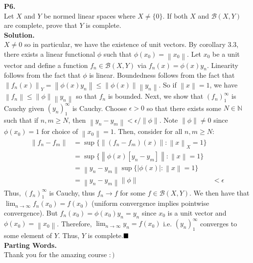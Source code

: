 \documentclass{article}
\newcommand{\norm}[1]{\left\lVert#1\right\rVert}
\begin{document}
    \newpage
    \textbf{P6.}\\

    Let $X$ and $Y$ be normed linear spaces where $X\neq\{0\}$. If both $X$ and $\mathscr{B}(X,Y)$ are complete, prove that $Y$ is complete.\\

    \textbf{Solution.}\\

    $X\neq 0$ so in particular, we have the existence of unit vectors. By corollary 3.3, there exists a linear functional $\phi$ such that $\phi(x_0) = \norm{x_0}$.
    Let $x_0$ be a unit vector and define a function $f_n\in\mathscr{B}(X,Y)$ via $f_{n}(x) = \phi(x)y_n$. Linearity follows from the fact that $\phi$ is linear.
    Boundedness follows from the fact that $\norm{f_n(x)}_Y = \norm{\phi(x)y_n} \leq \norm{\phi(x)}\norm{y_n}$. So if $\norm{x}=1$, we have 
    $\norm{f_n}\leq \norm{\phi}\norm{y_n}$ so that $f_n$ is bounded. Next, we show that $(f_n)_1^{\infty}$ is Cauchy given $(y_n)_1^{\infty}$ is Cauchy.
    Choose $\epsilon>0$ so that there exists some $N\in\mathbb{N}$ such that if $n,m\geq N$, then $\norm{y_n-y_m}<\epsilon/\norm{\phi}$. Note $\norm{\phi}\neq 0$
    since $\phi(x_0) =1$ for choice of $\norm{x_0}=1$. Then, consider for all $n,m\geq N$:
    \begin{align*}
        \norm{f_n - f_m} &= \sup\{\norm{(f_n-f_m)(x)}: \norm{x}_X = 1\}  \\
            &= \sup\{\norm{\phi(x)[y_n-y_m]}: \norm{x}=1\} \\
            &= \norm{y_n-y_m}\sup\{|\phi(x)|: \norm{x}=1\} \\
            &= \norm{y_n-y_m}\norm{\phi}
            &< \epsilon
    \end{align*}
    Thus, $(f_n)_1^{\infty}$ is Cauchy, thus $f_n\to f$ for some $f\in \mathscr{B}(X,Y)$. We then have that $\lim_{n\to\infty} f_n(x_0) = f(x_0)$ (uniform convergence
    implies pointwise convergence). But $f_n(x_0) = \phi(x_0)y_n = y_n$ since $x_0$ is a unit vector and $\phi(x_0) = \norm{x_0}$. Therefore,
    $\lim_{n\to\infty} y_n = f(x_0)$ i.e. $(y_n)_1^{\infty}$ converges to some element of $Y$. Thus, $Y$ is complete.$\hfill\blacksquare$\\

    \textbf{Parting Words.}\\

    Thank you for the amazing course $:)$
\end{document}
